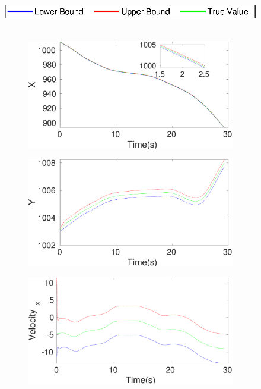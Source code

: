 \begin{figure}[h]
\hspace*{\fill} \includegraphics[scale=0.8]{figures/legend}\\\\
\begin{subfigure}{.5\linewidth}
\centering
\includegraphics[width=\linewidth]{figures/Frad/s3caSMX}
\end{subfigure}
\begin{subfigure}{.5\linewidth}
\centering
\includegraphics[width=\linewidth]{figures/Frad/s3caSMY}
\end{subfigure}
\begin{subfigure}{.5\linewidth}
\centering
\includegraphics[width=\linewidth]{figures/Frad/s3caSMVelocity_x}

\end{subfigure}
\end{figure}
